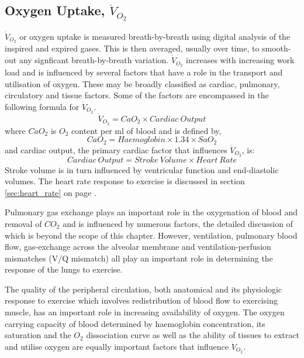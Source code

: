 \subsection[Oxygen Uptake]{Oxygen Uptake, $\dot{V}_{O_2}$}

$\dot{V}_{O_2}$ or oxygen uptake is measured breath-by-breath using digital analysis of the inspired and expired gases. 
This is then averaged, usually over time, to smooth-out any signficant breath-by-breath variation. $\dot{V}_{O_2}$ increases with increasing work load and is influenced by several factors that have a role in the transport and utilisation of oxygen. 
These may be broadly classified as cardiac, pulmonary, circulatory and tissue factors. 
Some of the factors are encompassed in the following formula for $\dot{V}_{O_2}$.
\begin{equation} \label{eq:oxygen_consumption}
	\dot{V}_{O_2} = CaO_2 \times Cardiac\ Output
\end{equation}
where $CaO_2$ is $O_2$ content per ml of blood and is defined by,
\begin{equation} \label{eq:CaO2}
	CaO_2 = Haemoglobin \times 1.34 \times SaO_2
\end{equation}
and
cardiac output, the primary cardiac factor that influences $\dot{V}_{O_2}$, is:
\begin{equation} \label{eq:CO=SVxHR}
	Cardiac\ Output = Stroke\ Volume \times Heart\ Rate
\end{equation}
Stroke volume is in turn influenced by ventricular function and end-diastolic volumes. 
The heart rate response to exercise is discussed in section \ref{sec:heart_rate} on page \pageref{sec:heart_rate}.

Pulmonary gas exchange plays an important role in the oxygenation of blood and removal of $CO_2$ and is influenced by numerous factors, the detailed discussion of which is beyond the scope of this chapter. 
However, ventilation, pulmonary blood flow, gas-exchange across the alveolar membrane and ventilation-perfusion mismatches (V/Q mismatch) all play an important role in determining the response of the lungs to exercise.

The quality of the peripheral circulation, both anatomical and its physiologic response to exercise which involves redistribution of blood flow to exercising muscle, has an important role in increasing availability of oxygen. 
The oxygen carrying capacity of blood determined by haemoglobin concentration, its saturation and the $O_2$ dissociation curve as well as the ability of tissues to extract and utilise oxygen are equally important factors that influence $\dot{V}_{O_2}$.

